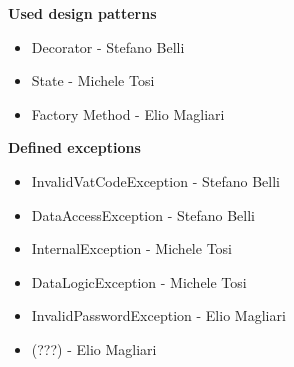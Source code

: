 \documentclass{article}
\begin{document}
\textbf{Used design patterns}

\begin{itemize}
	\item Decorator - Stefano Belli
	\item State - Michele Tosi
	\item Factory Method - Elio Magliari
\end{itemize}

\textbf{Defined exceptions}

\begin{itemize}
	\item InvalidVatCodeException - Stefano Belli
	\item DataAccessException - Stefano Belli
	\item InternalException - Michele Tosi
	\item DataLogicException - Michele Tosi
	\item InvalidPasswordException - Elio Magliari
	\item (???) - Elio Magliari
\end{itemize}
\end{document}

